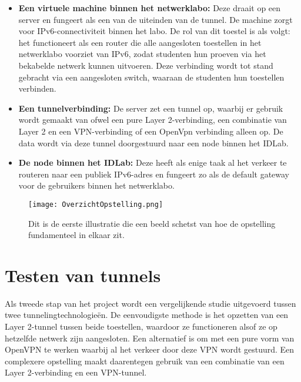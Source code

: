 \begin{itemize}
    \item \textbf{Een virtuele machine binnen het netwerklabo:}  
    Deze draait op een server en fungeert als een van de uiteinden van de tunnel. De machine zorgt voor IPv6-connectiviteit binnen het labo.  
    De rol van dit toestel is als volgt: het functioneert als een router die alle aangesloten toestellen in het netwerklabo voorziet van IPv6, zodat studenten hun proeven via het bekabelde netwerk kunnen uitvoeren.
    Deze verbinding wordt tot stand gebracht via een aangesloten switch, waaraan de studenten hun toestellen verbinden.

    \item \textbf{Een tunnelverbinding:}  
    De server zet een tunnel op, waarbij er gebruik wordt gemaakt van ofwel een pure Layer 2-verbinding, een combinatie van Layer 2 en een VPN-verbinding of een OpenVpn verbinding alleen op. De data wordt via deze tunnel doorgestuurd naar een node binnen het IDLab.

    \item \textbf{De node binnen het IDLab:}  
    Deze heeft als enige taak al het verkeer te routeren naar een publiek IPv6-adres en fungeert zo als de default gateway voor de gebruikers binnen het netwerklabo.
\end{itemize}

\begin{figure}[H]
    \centering
    \texttt{[image: OverzichtOpstelling.png]}
    \caption[Overzicht van de opstelling.]{\label{fig:opstelling}Dit is de eerste illustratie die een beeld schetst van hoe de opstelling fundamenteel in elkaar zit.}
\end{figure}

\section{Testen van tunnels}
\label{sec:testen van tunnels}

Als tweede stap van het project wordt een vergelijkende studie uitgevoerd tussen twee tunnelingtechnologieën.  
De eenvoudigste methode is het opzetten van een Layer 2-tunnel tussen beide toestellen, waardoor ze functioneren alsof ze op hetzelfde netwerk zijn aangesloten.
Een alternatief is om met een pure vorm van OpenVPN te werken waarbij al het verkeer door deze VPN wordt gestuurd.
Een complexere opstelling maakt daarentegen gebruik van een combinatie van een Layer 2-verbinding en een VPN-tunnel.  

